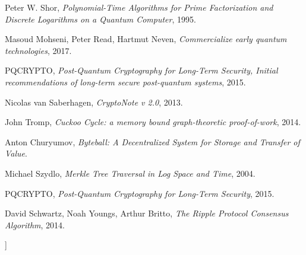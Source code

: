 \documentclass[a4paper,10pt,twocolumn]{article}
\begin{document}
\begin{@twocolumnfalse}
\begin{thebibliography}{99}
		Peter W. Shor, 
			\emph{Polynomial-Time Algorithms for Prime Factorization and Discrete Logarithms on a Quantum Computer}, 1995.
			
		Masoud Mohseni, Peter Read, Hartmut Neven,
			\emph{Commercialize early quantum technologies}, 2017.
			
		PQCRYPTO,
			\emph{Post-Quantum Cryptography for Long-Term Security, Initial recommendations of long-term secure post-quantum
			systems}, 2015.
				
		Nicolas van Saberhagen,
			\emph{CryptoNote v 2.0}, 2013.
	
		John Tromp,
			\emph{Cuckoo Cycle: a memory bound graph-theoretic proof-of-work}, 2014.
	
		Anton Churyumov,
			\emph{Byteball: A Decentralized System for Storage and 	Transfer of Value}.	
	
		Michael Szydlo,
			\emph{Merkle Tree Traversal in Log Space and Time}, 2004.	
	
			PQCRYPTO,
				\emph{Post-Quantum Cryptography for Long-Term Security}, 2015.	
		
		David Schwartz, Noah Youngs, Arthur Britto,
				\emph{The Ripple Protocol Consensus Algorithm}, 2014.	
		
	
		\end{thebibliography}
		
		\end{@twocolumnfalse}
		]
	
	
	\clearpage
	
\end{document}
